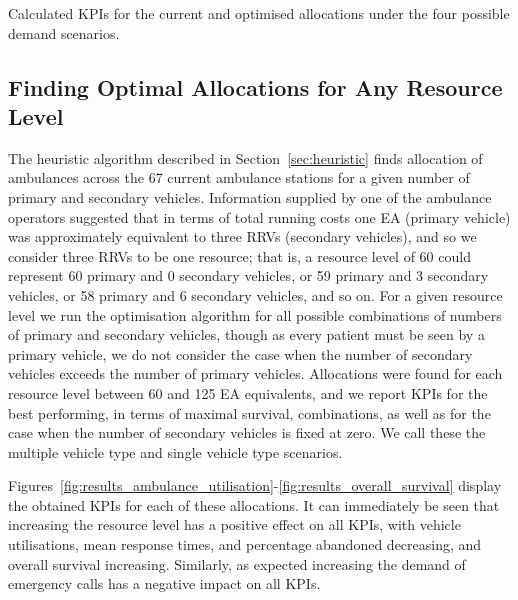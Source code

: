 \documentclass[preprint,12pt]{elsarticle}
\begin{document}
\begin{table}
\begin{center}
\resizebox{\textwidth}{!}{%
%
}
\caption{Calculated KPIs for the current and optimised allocations under the
four possible demand scenarios.}
\label{tbl:current_optimal_compare}
\end{center}
\end{table}


\subsection{Finding Optimal Allocations for Any Resource Level}\label{sec:vehicle_numbers}
The heuristic algorithm described in Section~\ref{sec:heuristic} finds
allocation of ambulances across the 67 current ambulance stations for a given
number of primary and secondary vehicles. Information supplied by one of the
ambulance operators suggested that in terms of total running costs one EA
(primary vehicle) was approximately equivalent to three RRVs (secondary
vehicles), and so we consider three RRVs to be one resource; that is, a
resource level of 60 could represent 60 primary and 0 secondary vehicles, or
59 primary and 3 secondary vehicles, or 58 primary and 6 secondary vehicles,
and so on. For a given resource level we run the optimisation algorithm for
all possible combinations of numbers of primary and secondary vehicles, though
as every patient must be seen by a primary vehicle, we do not consider the
case when the number of secondary vehicles exceeds the number of primary
vehicles.
Allocations were found for each resource level between 60 and 125 EA
equivalents, and we report KPIs for the best performing, in terms of maximal
survival, combinations, as well as for the case when the number of secondary
vehicles is fixed at zero. We call these the multiple vehicle type and single
vehicle type scenarios.

Figures~\ref{fig:results_ambulance_utilisation}-\ref{fig:results_overall_survival}
display the obtained KPIs for each of these allocations. It can immediately be
seen that increasing the resource level has a positive effect on all KPIs,
with vehicle utilisations, mean response times, and percentage abandoned
decreasing, and overall survival increasing. Similarly, as expected increasing
the demand of emergency calls has a negative impact on all KPIs.
\end{document}
